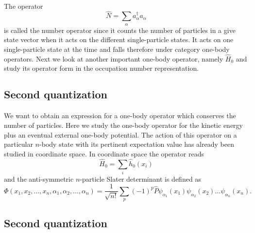 \documentclass[%
twoside,                 %
final,                   %
10pt]{article}
\begin{document}
\paragraph{}
The operator 
\begin{equation}
	\hat{N} = \sum_\alpha a_\alpha^{\dagger} a_\alpha \label{eq:2-22}
\end{equation}
is called the number operator since it counts the number of particles in a give state vector when it acts 
on the different single-particle states.  It acts on one single-particle state at the time and falls 
therefore under category one-body operators.
Next we look at another important one-body operator, namely $\hat{H}_0$ and study its operator form in the 
occupation number representation.




\subsection*{Second quantization}

\paragraph{}
We want to obtain an expression for a one-body operator which conserves the number of particles.
Here we study the one-body operator for the kinetic energy plus an eventual external one-body potential.
The action of this operator on a particular $n$-body state with its pertinent expectation value has already
been studied in coordinate  space.
In coordinate space the operator reads
\begin{equation}
	\hat{H}_0 = \sum_i \hat{h}_0(x_i) \label{eq:2-23}
\end{equation}
and the anti-symmetric $n$-particle Slater determinant is defined as 
\[
\Phi(x_1, x_2,\dots ,x_n,\alpha_1,\alpha_2,\dots, \alpha_n)= \frac{1}{\sqrt{n!}} \sum_p (-1)^p\hat{P}\psi_{\alpha_1}(x_1)\psi_{\alpha_2}(x_2) \dots \psi_{\alpha_n}(x_n).
\]




\subsection*{Second quantization}

\end{document}
